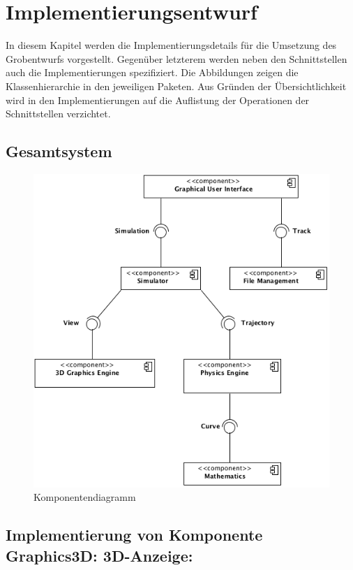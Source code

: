 \chapter{Implementierungsentwurf}

In diesem Kapitel werden die Implementierungsdetails für die Umsetzung des
Grobentwurfs vorgestellt. Gegenüber letzterem werden neben den Schnittstellen
auch die Implementierungen spezifiziert. Die Abbildungen zeigen die 
Klassenhierarchie in den jeweiligen Paketen. Aus Gründen der Übersichtlichkeit
wird in den Implementierungen auf die Auflistung der Operationen der Schnittstellen
verzichtet.



\newpage

\section{Gesamtsystem}
\begin{figure}[!h]
	\includegraphics[width=0.8\linewidth]{bilder/components.png}
\caption{Komponentendiagramm}
\end{figure}

\section{Implementierung von Komponente
         Graphics3D: 3D-Anzeige:}

